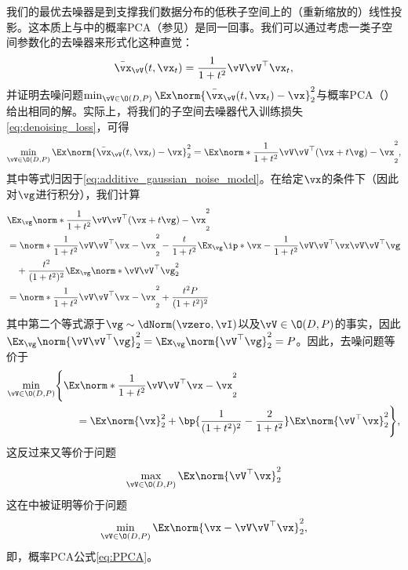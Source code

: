 \documentclass[../../book-main_zh.tex]{subfiles}
\begin{document}
我们的最优去噪器是到支撑我们数据分布的低秩子空间上的（重新缩放的）线性投影。这本质上与中的概率PCA（参见）是同一回事。我们可以通过考虑一类子空间参数化的去噪器来形式化这种直觉：
\begin{equation}\label{eq:optimal nn}
    \bar{\vx}_{\vV}(t, \vx_{t}) = \frac{1}{1 + t^{2}}\vV\vV^{\top}\vx_{t},
\end{equation}
并证明去噪问题\(\min_{\vV \in \O(D, P)}\Ex\norm{\bar{\vx}_{\vV}(t, \vx_{t}) - \vx}_{2}^{2}\)与概率PCA（）给出相同的解。实际上，将我们的子空间去噪器代入训练损失\eqref{eq:denoising_loss}，可得
\begin{equation}
    \min_{\vV \in \O(D, P)}\Ex\norm{\bar{\vx}_{\vV}(t,
    \vx_{t}) - \vx}_{2}^{2} = \Ex\norm*{\frac{1}{1 +
    t^{2}}\vV\vV^{\top}(\vx + t\vg) - \vx}_{2}^{2},
\end{equation}
其中等式归因于\eqref{eq:additive_gaussian_noise_model}。在给定\(\vx\)的条件下（因此对\(\vg\)进行积分），我们计算
\begin{align}
    & \Ex_{\vg}\norm*{\frac{1}{1 + t^{2}}\vV\vV^{\top}(\vx + t\vg) -
    \vx}_{2}^{2} \\
    &= \norm*{\frac{1}{1 + t^{2}}\vV\vV^{\top}\vx - \vx}_{2}^{2} -
    \frac{t}{1+t^2}\Ex_{\vg} \ip*{\vx - \frac{1}{1 +
    t^{2}}\vV\vV^{\top}\vx}{\vV\vV^{\top}\vg} \\
    &\quad + \frac{t^2}{(1+t^2)^2} \Ex_{\vg}\norm*{\vV\vV^{\top} \vg}_{2}^{2} \\
    &= \norm*{\frac{1}{1 + t^{2}}\vV\vV^{\top}\vx - \vx}_{2}^{2} +
    \frac{t^2P}{(1+t^2)^2}
\end{align}
其中第二个等式源于\(\vg \sim \dNorm(\vzero, \vI)\)以及\(\vV \in \O(D, P)\)的事实，因此\(\Ex_{\vg}\norm{\vV\vV^\top \vg}_{2}^{2} = \Ex_{\vg}\norm{\vV^\top \vg}_{2}^{2} = P\)。因此，去噪问题等价于
\begin{align}
    \min_{\vV \in \O(D, P)} & \Bigg\{\Ex \norm*{\frac{1}{1 +
        t^{2}}\vV\vV^{\top}\vx - \vx}_{2}^{2} \\
        & \qquad = \Ex\norm{\vx}_{2}^{2} + \bp{\frac{1}{(1 +
            t^{2})^{2}} - \frac{2}{1 +
    t^{2}}}\Ex\norm{\vV^{\top}\vx}_{2}^{2}\Bigg\},
\end{align}
这反过来又等价于问题
\begin{equation}\label{eq:PCA}
    \max_{\vV \in \O(D, P)}\Ex\norm{\vV^{\top}\vx}_{2}^{2}
\end{equation}
这在中被证明等价于问题
\begin{equation}
    \min_{\vV \in \O(D, P)}\Ex\norm{\vx - \vV\vV^{\top}\vx}_{2}^{2},
\end{equation}
即，概率PCA公式\eqref{eq:PPCA}。
\end{document}
